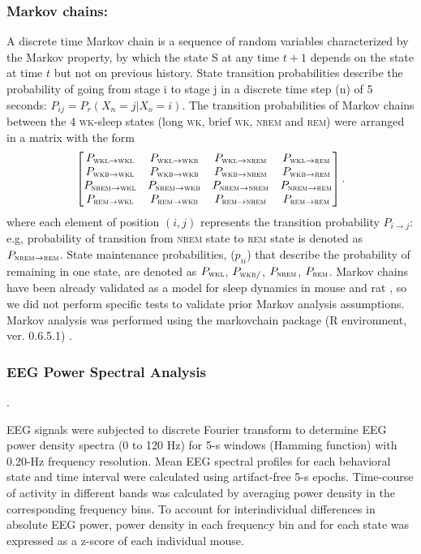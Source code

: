 \documentclass[10pt,letterpaper]{article}
\def\REM/{\textsc{rem}}
\def\NREM/{\textsc{nrem}}
\def\WK/{\textsc{wk}}
\def\WKL/{\textsc{wkl}}
\def\WKB/{\textsc{wkb}}
\begin{document}
\subsubsection{Markov chains:} A discrete time Markov chain is a sequence of random variables characterized by the Markov property, by which the state S at any time $t+1$ depends on the state at time $t$ but not on previous history. State transition probabilities describe the probability of going from stage i to stage j in a discrete time step (n) of 5 seconds: $P_{ij}=P_r(X_n=j|X_o=i)$.  The transition probabilities of Markov chains between the 4 \WK/-sleep states (long \WK/, brief \WK/,  \NREM/ and \REM/)  were arranged in a matrix with the form 
\[
\begin{bmatrix}
P_{\WKL/ \rightarrow \WKL/} & P_{\WKL/ \rightarrow \WKB/} & P_{\WKL/ \rightarrow \NREM/} & P_{\WKL/ \rightarrow\REM/} \\
P_{\WKB/ \rightarrow \WKL/} & P_{\WKB/ \rightarrow \WKB/} & P_{\WKB/ \rightarrow \NREM/} & P_{\WKB/ \rightarrow\REM/} \\
P_{\NREM/ \rightarrow \WKL/} & P_{\NREM/ \rightarrow \WKB/} & P_{\NREM/ \rightarrow \NREM/} & P_{\NREM/ \rightarrow\REM/} \\
P_{\REM/ \rightarrow \WKL/} & P_{\REM/ \rightarrow \WKB/} & P_{\REM/ \rightarrow \NREM/} & P_{\REM/ \rightarrow\REM/} 
\end{bmatrix}
.\]  
where each element of position $(i,j)$ represents the transition probability $P_{i\rightarrow j}$: e.g, probability of transition from \NREM/ state to \REM/ state is denoted as $P_{\NREM/\rightarrow \REM/}$. State maintenance probabilities, ($p_{ii}$) that describe the probability of remaining in one state, are denoted as $P_{\WKL/}$, $P_{\WKB//}$, $P_{\NREM/}$, $P_{\REM/}$. Markov chains have been already validated as a  model for sleep dynamics in mouse and rat \cite{stephenson2013statistical}, so we did not perform specific tests to validate prior Markov analysis assumptions. Markov analysis was performed using the markovchain package (R environment, ver. 0.6.5.1) \cite{Spedicato2015}. 

\subsubsection{EEG Power Spectral Analysis}.

EEG signals were subjected to discrete Fourier transform to determine EEG power density spectra (0 to 120 Hz) for 5-s windows (Hamming function) with 0.20-Hz frequency resolution. Mean EEG spectral profiles for each behavioral state and time interval were calculated using artifact-free 5-s epochs.  Time-course of activity in different bands  was  calculated by averaging power density in the corresponding frequency bins. To account for interindividual differences in absolute EEG power, power density in each frequency bin and for each state was expressed as a z-score of  each individual mouse.
\end{document}
